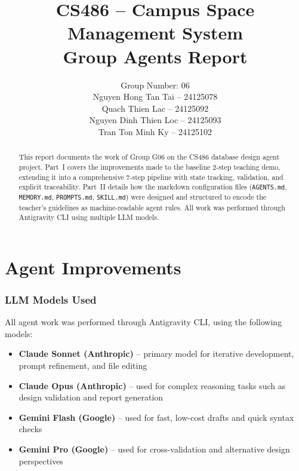 \documentclass[12pt,a4paper]{article}
\title{\textbf{CS486 -- Campus Space Management System} \\ \vspace{0.5cm} \Large \textbf{Group Agents Report}}
\author{Group Number: 06 \\Nguyen Hong Tan Tai -- 24125078 \\Quach Thien Lac -- 24125092 \\ Nguyen Dinh Thien Loc -- 24125093 \\ Tran Ton Minh Ky -- 24125102}
\begin{document}
\maketitle

\begin{abstract}
This report documents the work of Group G06 on the CS486 database design agent project. Part~I covers the improvements made to the baseline 2-step teaching demo, extending it into a comprehensive 7-step pipeline with state tracking, validation, and explicit traceability. Part~II details how the markdown configuration files (\texttt{AGENTS.md}, \texttt{MEMORY.md}, \texttt{PROMPTS.md}, \texttt{SKILL.md}) were designed and structured to encode the teacher's guidelines as machine-readable agent rules. All work was performed through Antigravity CLI using multiple LLM models.
\end{abstract}


\newpage

\tableofcontents

\newpage


\part{Agent Improvements}

\section{LLM Models Used}

All agent work was performed through Antigravity CLI, using the following models:

\begin{itemize}
    \item \textbf{Claude Sonnet (Anthropic)} -- primary model for iterative development, prompt refinement, and file editing
    \item \textbf{Claude Opus (Anthropic)} -- used for complex reasoning tasks such as design validation and report generation
    \item \textbf{Gemini Flash (Google)} -- used for fast, low-cost drafts and quick syntax checks
    \item \textbf{Gemini Pro (Google)} -- used for cross-validation and alternative design perspectives
\end{itemize}
\end{document}
